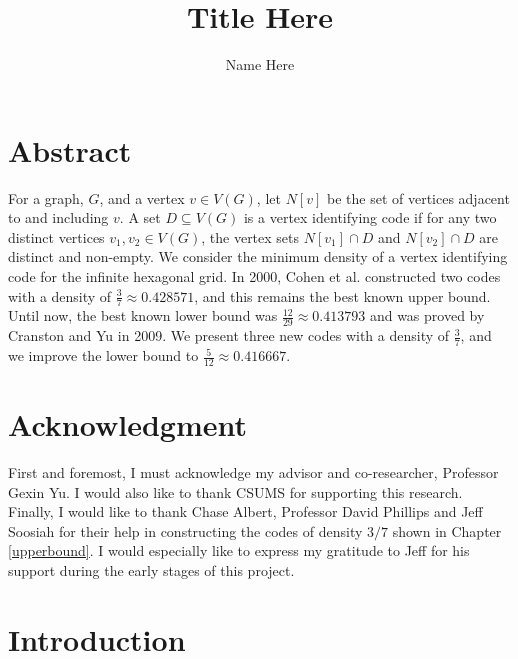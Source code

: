 \documentclass[12pt]{report}
\numberwithin{equation}{chapter}
\theoremstyle{definition}
\theoremstyle{remark}
\begin{document}

\title{\huge Title Here}
\author{\Large Name Here}
\date{}
\maketitle





\chapter*{Abstract}


For a graph, $G$, and a vertex $v \in V(G)$, let $N[v]$ be the set of vertices adjacent to and including $v$.  A set $D \subseteq V(G)$ is a vertex identifying code if for any two distinct vertices $v_1, v_2 \in V(G)$, the vertex sets $N[v_1] \cap D$ and $N[v_2] \cap D$ are distinct and non-empty.  We consider the minimum density of a vertex identifying code for the infinite hexagonal grid.  In 2000, Cohen et al. constructed two codes with a density of $\frac{3}{7} \approx 0.428571$, and this remains the best known upper bound.  Until now, the best known lower bound was $\frac{12}{29} \approx 0.413793$ and was proved by Cranston and Yu in 2009.  We present three new codes with a density of $\frac{3}{7}$, and we improve the lower bound to $\frac{5}{12} \approx 0.416667$.



\chapter*{Acknowledgment}

First and foremost, I must acknowledge my advisor and co-researcher, Professor Gexin Yu.  I would also like to thank CSUMS for supporting this research.  Finally, I would like to thank Chase Albert, Professor David Phillips and Jeff Soosiah for their help in constructing the codes of density $3/7$ shown in Chapter \ref{upperbound}.  I would especially like to express my gratitude to Jeff for his support during the early stages of this project.


\tableofcontents

\listoffigures



\chapter{Introduction}
\end{document}
